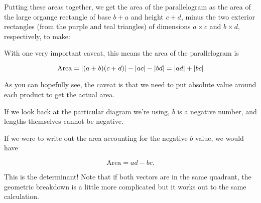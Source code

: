 \documentclass{ximera}
\begin{document}
\begin{example}
\begin{explanation}
      Putting these areas together, we get the area of the parallelogram as the area of the large organge rectangle of base $b+a$ and height $c+d$, minus the two exterior rectangles (from the purple and teal triangles) of dimensions $a\times c$ and $b\times d$, respectively, to make:

      \begin{center}
        \end{center}

      With one very important caveat, this means the area of the parallelogram is 

      $$\text{Area}=\left|(a+b)(c+d)\right|-\left|ac\right|-\left|bd\right|=\left|ad\right|+\left|bc\right|$$

      As you can hopefully see, the caveat is that we need to put absolute value around each product to get the actual area. 

      If we look back at the particular diagram we're using, $b$ is a negative number, and lengths themselves cannot be negative. 

      If we were to write out the area accounting for the negative $b$ value, we would have

      $$\text{Area}=ad-bc.$$

      This is the determinant! Note that if both vectors are in the same quadrant, the geometric breakdown is a little more complicated but it works out to the same calculation.

  

      \end{explanation}
      \end{example}
\end{document}
